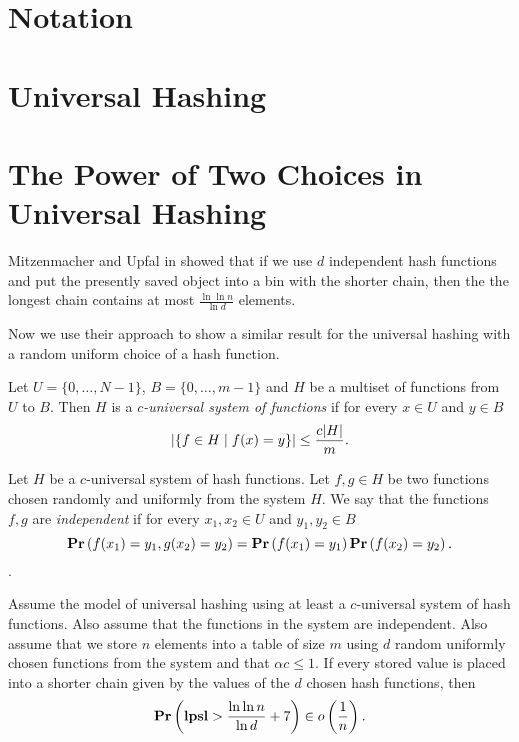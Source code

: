 \section{Notation}

\section{Universal Hashing}

\section{The Power of Two Choices in Universal Hashing}

Mitzenmacher and Upfal in \cite{1076315} showed that if we use $d$ independent hash functions and put the presently saved object into a bin with the shorter chain, then the the longest chain contains at most $\frac{\ln \ln n}{\ln d}$ elements.

Now we use their approach to show a similar result for the universal hashing with a random uniform choice of a hash function.

\begin{definition}
\label{definition-c-universal-system}
Let $U = \lbrace 0, \dots, N - 1 \rbrace$, $B = \lbrace 0, \dots, m - 1 \rbrace$ and $H$ be a multiset of functions from $U$ to $B$. Then $H$ is a \emph{$c$-universal system of functions} if for every $x \in U$ and $y \in B$ 
\[
\left|\lbrace f \in H \mid f(x) = y \rbrace\right| \leq \frac{c |H|}{m} \textit{.}
\]
\end{definition}

\begin{definition}
\label{definition-independent-hash-functions}
Let $H$ be a $c$-universal system of hash functions. Let $f, g \in H$ be two functions chosen randomly and uniformly from the system $H$. We say that the functions $f, g$ are \emph{independent} if for every $x_1, x_2 \in U$ and $y_1, y_2 \in B$ $$\mathbf{Pr}\left(f(x_1) = y_1, g(x_2\right) = y_2) = \mathbf{Pr}\left(f(x_1) = y_1\right) \mathbf{Pr}\left(f(x_2) = y_2\right) \textit{.}$$.
\end{definition}

\begin{theorem}
\label{theorem-universal-hashing-two-choices}
Assume the model of universal hashing using at least a $c$-universal system of hash functions. Also assume that the functions in the system are independent. Also assume that we store $n$ elements into a table of size $m$ using $d$ random uniformly chosen functions from the system and that $\alpha c \leq 1$. If every stored value is placed into a shorter chain given by the values of the $d$ chosen hash functions, then $$\mathbf{Pr}\left(\mathbf{lpsl} > \frac{\ln \ln n}{\ln d} + 7\right) \in o\left(\frac{1}{n}\right) \textit{.}$$
\end{theorem}

